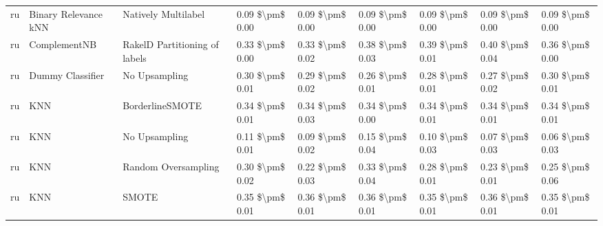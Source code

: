 \begin{tabular}{lllllllll}
      ru &            Binary Relevance kNN &           Natively Multilabel & 0.09 \$\textbackslash pm\$ 0.00 &           0.09 \$\textbackslash pm\$ 0.00 &       0.09 \$\textbackslash pm\$ 0.00 &        0.09 \$\textbackslash pm\$ 0.00 &                         0.09 \$\textbackslash pm\$ 0.00 &     0.09 \$\textbackslash pm\$ 0.00 \\
      ru &                    ComplementNB & RakelD Partitioning of labels & 0.33 \$\textbackslash pm\$ 0.00 &           0.33 \$\textbackslash pm\$ 0.02 &       0.38 \$\textbackslash pm\$ 0.03 &        0.39 \$\textbackslash pm\$ 0.01 &                         0.40 \$\textbackslash pm\$ 0.04 &     0.36 \$\textbackslash pm\$ 0.00 \\
      ru &                Dummy Classifier &                 No Upsampling & 0.30 \$\textbackslash pm\$ 0.01 &           0.29 \$\textbackslash pm\$ 0.02 &       0.26 \$\textbackslash pm\$ 0.01 &        0.28 \$\textbackslash pm\$ 0.01 &                         0.27 \$\textbackslash pm\$ 0.02 &     0.30 \$\textbackslash pm\$ 0.01 \\
      ru &                             KNN &               BorderlineSMOTE & 0.34 \$\textbackslash pm\$ 0.01 &           0.34 \$\textbackslash pm\$ 0.03 &       0.34 \$\textbackslash pm\$ 0.00 &        0.34 \$\textbackslash pm\$ 0.01 &                         0.34 \$\textbackslash pm\$ 0.01 &     0.34 \$\textbackslash pm\$ 0.01 \\
      ru &                             KNN &                 No Upsampling & 0.11 \$\textbackslash pm\$ 0.01 &           0.09 \$\textbackslash pm\$ 0.02 &       0.15 \$\textbackslash pm\$ 0.04 &        0.10 \$\textbackslash pm\$ 0.03 &                         0.07 \$\textbackslash pm\$ 0.03 &     0.06 \$\textbackslash pm\$ 0.03 \\
      ru &                             KNN &           Random Oversampling & 0.30 \$\textbackslash pm\$ 0.02 &           0.22 \$\textbackslash pm\$ 0.03 &       0.33 \$\textbackslash pm\$ 0.04 &        0.28 \$\textbackslash pm\$ 0.01 &                         0.23 \$\textbackslash pm\$ 0.01 &     0.25 \$\textbackslash pm\$ 0.06 \\
      ru &                             KNN &                         SMOTE & 0.35 \$\textbackslash pm\$ 0.01 &           0.36 \$\textbackslash pm\$ 0.01 &       0.36 \$\textbackslash pm\$ 0.01 &        0.35 \$\textbackslash pm\$ 0.01 &                         0.36 \$\textbackslash pm\$ 0.01 &     0.35 \$\textbackslash pm\$ 0.01 \\

\end{tabular}
